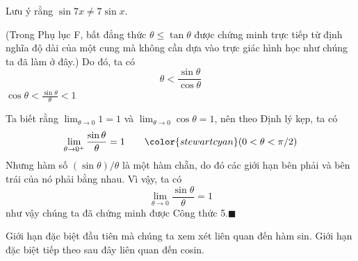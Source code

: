 \noindent
\begin{minipage}[t]{0.26\textwidth}
    \vspace*{565pt}
    \raggedright
    {\small\textsf{\color{stewartcyan}Lưu ý rằng $\sin 7x \neq 7\sin x$.}}
\end{minipage}%
\hfill
\begin{minipage}[t]{0.71\textwidth}
    \noindent
    (Trong Phụ lục F, bất đẳng thức $\theta \leqslant \tan \theta$ được chứng minh trực tiếp từ định nghĩa độ dài của một cung mà không cần dựa vào trực giác hình học như chúng ta đã làm ở đây.) Do đó, ta có
    \[
    \theta < \frac{\sin\theta}{\cos\theta}
    \]
    \noindent
    \hfill
    $\displaystyle \cos\theta < \frac{\sin\theta}{\theta} < 1$%
    \hfill\null

    \vspace{6pt}
    \noindent
    Ta biết rằng $\lim_{\theta \to 0} 1 = 1$ và $\lim_{\theta \to 0}\cos\theta = 1$, nên theo Định lý kẹp, ta có
    \[
    \lim_{\theta \to 0^+} \frac{\sin\theta}{\theta} = 1 \qquad {\color{stewartcyan}(0 < \theta < \pi/2)}
    \]
    Nhưng hàm số $(\sin\theta)/\theta$ là một hàm chẵn, do đó các giới hạn bên phải và bên trái của nó phải bằng nhau. Vì vậy, ta có
    \[
    \lim_{\theta \to 0} \frac{\sin\theta}{\theta} = 1
    \]
    \noindent
    như vậy chúng ta đã chứng minh được Công thức 5.\hfill{\color{stewartred}$\blacksquare$}

    \vspace{8pt}
    Giới hạn đặc biệt đầu tiên mà chúng ta xem xét liên quan đến hàm sin. Giới hạn đặc biệt tiếp theo sau đây liên quan đến cosin.

    \vspace{8pt}
    \noindent
    \begin{minipage}{\linewidth}
        \centering
    \end{minipage}


\end{minipage}
